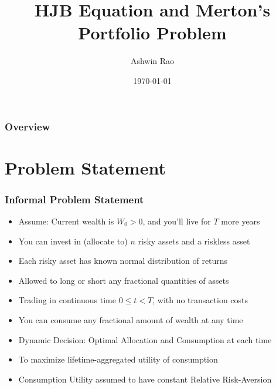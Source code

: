\documentclass[handout]{beamer}
\title[HJB and Merton Portfolio]{HJB Equation and Merton's Portfolio Problem} %
\author{Ashwin Rao} %
\institute[Stanford] %
{
ICME, Stanford University
}
\date{\today} %
\begin{document}
\begin{frame}
\titlepage %
\end{frame}

\begin{frame}
\frametitle{Overview} %
\tableofcontents %
\end{frame}

\section{Problem Statement}

\begin{frame}
\frametitle{Informal Problem Statement}
\pause
\begin{itemize}[<+->]
\item Assume: Current wealth is $W_0 > 0$, and you'll live for $T$ more years
\item You can invest in (allocate to) $n$ risky assets and a riskless asset
\item Each risky asset has known normal distribution of returns
\item Allowed to long or short any fractional quantities of assets
\item Trading in continuous time $0 \leq t < T$, with no transaction costs
\item You can consume any fractional amount of wealth at any time
\item Dynamic Decision: Optimal Allocation and Consumption at each time
\item To maximize lifetime-aggregated utility of consumption
\item Consumption Utility assumed to have constant Relative Risk-Aversion
\end{itemize}
\end{frame}
\end{document}
